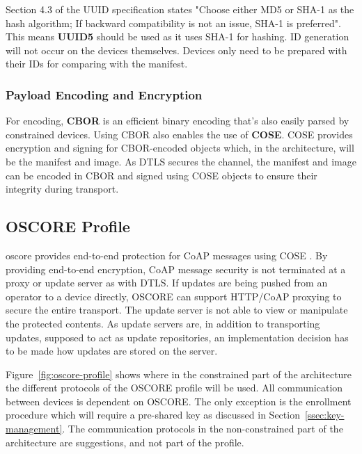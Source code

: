 \documentclass[0-thesis.tex]{subfiles}
\begin{document}
Section 4.3 of the UUID specification states "Choose either MD5 or SHA-1 as the hash
algorithm; If backward compatibility is not an issue, SHA-1 is preferred". This means
\textbf{UUID5} should be used as it uses SHA-1 for hashing. ID generation will not occur
on the devices themselves. Devices only need to be prepared with their IDs for comparing
with the manifest.

\subsubsection{Payload Encoding and Encryption}
\label{sssec:encoding-encryption}
For encoding, \textbf{CBOR} is an efficient binary encoding that's also easily parsed by
constrained devices. Using CBOR also enables the use of \textbf{COSE}. COSE provides
encryption and signing for CBOR-encoded objects which, in the architecture, will be the
manifest and image. As DTLS secures the channel, the manifest and image can be encoded in
CBOR and signed using COSE objects to ensure their integrity during transport. 

\subsection{OSCORE Profile}
\label{ssec:oscore-profile}
\acrfull{oscore} provides end-to-end protection for CoAP messages using COSE
\parencite{oscore}. By providing end-to-end encryption, CoAP message security is not
terminated at a proxy or update server as with DTLS. If updates are being pushed from an
operator to a device directly, OSCORE can support HTTP/CoAP proxying to secure the entire
transport. The update server is not able to view or manipulate the protected contents. As
update servers are, in addition to transporting updates, supposed to act as update
repositories, an implementation decision has to be made how updates are stored on the
server.

Figure~\ref{fig:oscore-profile} shows where in the constrained part of the architecture
the different protocols of the OSCORE profile will be used. All communication between
devices is dependent on OSCORE. The only exception is the enrollment procedure which will
require a pre-shared key as discussed in Section~\ref{ssec:key-management}. The
communication protocols in the non-constrained part of the architecture are suggestions,
and not part of the profile. 
\end{document}

